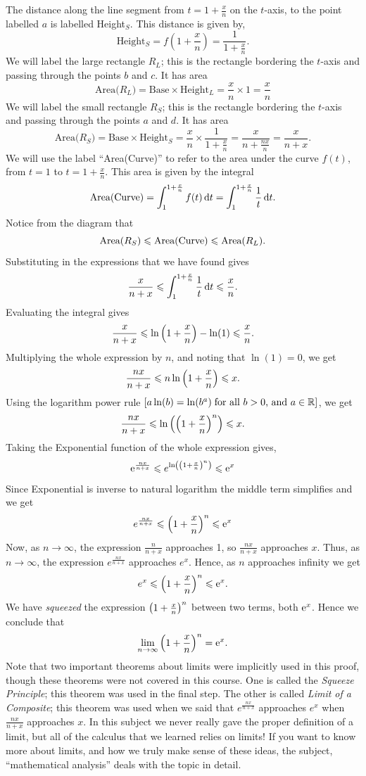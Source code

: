 The distance along the line segment from $t = 1 + \frac{x}{n}$ on the $t$-axis, to the point labelled $a$ is labelled Height$_S$. This distance is given by,
\[
\text{Height$_S$} = f(1 + \frac{x}{n}) = \frac{1}{1+\frac{x}{n}}.
\]
We will label the large rectangle $R_{L}$; this is the rectangle bordering the $t$-axis and passing through the points $b$ and $c$. It has area
\[
\text{Area($R_L$)} = \text{Base}\times \text{Height$_L$} = \frac{x}{n} \times 1 = \frac{x}{n}
\]
We will label the small rectangle $R_{S}$; this is the rectangle bordering the $t$-axis and passing through the points $a$ and $d$. It has area
\[
\text{Area($R_S$)} = \text{Base}\times \text{Height$_S$} = \frac{x}{n} \times \frac{1}{1+\frac{x}{n}} = \frac{x}{n + \frac{nx}{n}} = \frac{x}{n + x}.
\]
We will use the label ``Area(Curve)'' to refer to the area under the curve $f(t)$, from $t = 1$ to $t =1 + \frac{x}{n}.$ This area is given by the integral
\[
\text{Area(Curve)} = \int_1^{1+\frac{x}{n}} f(t) \ud t = \int_1^{1+\frac{x}{n}} \frac{1}{t} \ud t.
\]
Notice from the diagram that
\[
\text{Area($R_S$)} \leq \text{Area(Curve)} \leq \text{Area($R_L$)}. \\
\]
Substituting in the expressions that we have found gives
\[
\frac{x}{n+x} \leq \int_1^{1+\frac{x}{n}} \frac{1}{t} \ud t \leq \frac{x}{n}.
\]
Evaluating the integral gives
\[
\frac{x}{n+x} \leq \ln \brac{1 + \frac{x}{n}} - \ln(1) \leq \frac{x}{n}.
\]
Multiplying the whole expression by $n$, and noting that $\ln(1) = 0$, we get
\[
\frac{nx}{n+x} \leq n\ln \brac{1 + \frac{x}{n}} \leq x.
\]
Using the logarithm power rule $\squac{a\ln(b) = \ln(b^a) \; \text{for all $b > 0$, and $a \in \R$}}$, we get 
\[
\frac{nx}{n+x} \leq \ln \brac{\brac{1 + \frac{x}{n}}^n} \leq x.
\]
Taking the Exponential function of the whole expression gives,
\[
\e^{\frac{nx}{n+x}} \leq e^{\ln \brac{\brac{1 + \frac{x}{n}}^n}} \leq \e^x
\]
Since Exponential is inverse to natural logarithm the middle term simplifies and we get
\[
e^{\frac{nx}{n+x}} \leq \brac{1 + \frac{x}{n}}^n \leq \e^x
\]
Now, as $n \rightarrow \infty$, the expression $\frac{n}{n+x}$ approaches 1, so $\frac{nx}{n+x}$ approaches $x$. Thus, as $n \rightarrow \infty$, the expression $e^\frac{nx}{n+x}$ approaches $e^x$. Hence, as $n$ approaches infinity we get
\[
e^x \leq \brac{1 + \frac{x}{n}}^n \leq \e^x.
\]
We have \textit{squeezed} the expression $\brac{1 + \frac{x}{n}}^n$ between two terms, both $\e^x$. Hence we conclude that
\[
\lim_{n \rightarrow \infty}\brac{1 + \frac{x}{n}}^n = \e^x.
\]
Note that two important theorems about limits were implicitly used in this proof, though these theorems were not covered in this course. One is called the \textit{Squeeze Principle}; this theorem was used in the final step. The other is called \textit{Limit of a Composite}; this theorem was used when we said that $e^\frac{nx}{n+x}$ approaches $e^x$ when $\frac{nx}{n+x}$ approaches $x$. In this subject we never really gave the proper definition of a limit, but all of the calculus that we learned relies on limits! If you want to know more about limits, and how we truly make sense of these ideas, the subject, ``mathematical analysis'' deals with the topic in detail. \\

